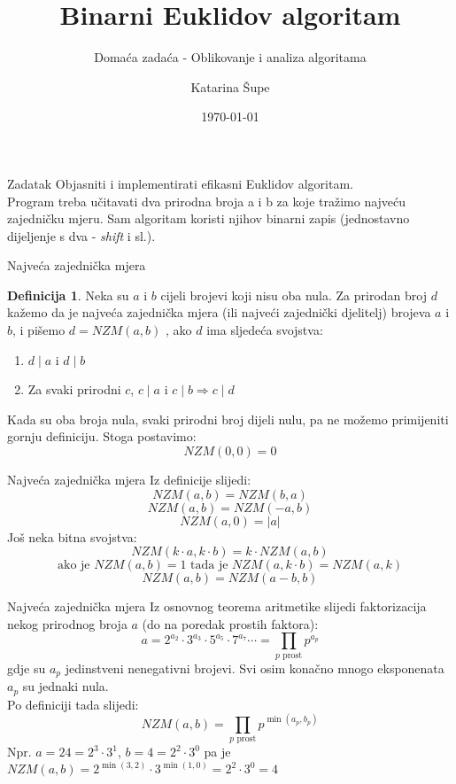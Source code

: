 \documentclass[xcolor=dvipsnames, notheorems]{beamer}
\title{Binarni Euklidov algoritam}
\subtitle{Domaća zadaća - Oblikovanje i analiza algoritama}
\author{\texorpdfstring{Katarina Šupe}{Katarina Supe}}
\institute[PMF--MO]{Prirodoslovno-matematički fakultet --- Matematički odsjek}
\date{\today}
\theoremstyle{plain} %
\theoremstyle{definition} %
\newtheorem{definition}{Definicija}[] %
\begin{document}
\begin{frame}[plain]
\titlepage
\end{frame}
\begin{frame}{Zadatak}
Objasniti i implementirati efikasni Euklidov algoritam.\\
Program treba učitavati dva prirodna broja a i b za koje tražimo najveću zajedničku mjeru. Sam algoritam koristi njihov binarni zapis (jednostavno dijeljenje s dva - \emph{shift} i sl.).
\end{frame}
\begin{frame}{Najveća zajednička mjera}
\begin{definition}
Neka su $a$ i $b$ cijeli brojevi koji nisu oba nula. Za prirodan broj $d$ kažemo da je najveća zajednička mjera (ili najveći zajednički djelitelj) brojeva $a$ i $b$, i pišemo $d=NZM(a,b)$ , ako $d$ ima sljedeća svojstva:
\begin{enumerate}
    \item   $d\mid a$ i $d\mid b$
    \item  Za svaki prirodni $c$, $c\mid a$ i $c \mid b \Rightarrow c\mid d$
\end{enumerate}
\end{definition}
Kada su oba broja nula, svaki prirodni broj dijeli nulu, pa ne možemo primijeniti gornju definiciju. Stoga postavimo:
\[ NZM(0,0) = 0 \]
\end{frame}

\begin{frame}{Najveća zajednička mjera}
Iz definicije slijedi:\\
\[ NZM(a,b) = NZM(b,a) \]
\[ NZM(a,b) = NZM(-a,b) \]
\[ NZM(a, 0) = |a| \]
Još neka bitna svojstva:
\[ NZM(k \cdot a, k \cdot b) = k \cdot  NZM(a,b) \]
\[ \text{ako je } NZM(a,b) = 1 \text{ tada je } NZM(a, k \cdot b) =NZM(a, k) \]
\[ NZM(a, b) = NZM(a - b, b) \]
\end{frame}


\begin{frame}{Najveća zajednička mjera}
Iz osnovnog teorema aritmetike slijedi faktorizacija nekog prirodnog broja $a$ (do na poredak prostih faktora):
\[ a = 2^{a_2} \cdot 3^{a_3} \cdot 5^{a_5} \cdot 7^{a_7} \cdots =   \prod_{p \text{ prost}} p^{a_p} \]
gdje su $a_p$ jedinstveni nenegativni brojevi. Svi osim konačno mnogo eksponenata $a_p$ su jednaki nula.  \\
Po definiciji tada slijedi:
\[ NZM(a,b) = \prod_{p \text{ prost}} p^{\min(a_p, b_p)} \]
Npr. $a = 24 = 2^3 \cdot 3^1$, $b = 4 = 2^2 \cdot 3^0$ pa je $NZM(a,b) = 2^{\min(3,2)} \cdot 3^{\min(1,0)} = 2^2 \cdot 3^0 = 4$
\end{frame}
\end{document}
